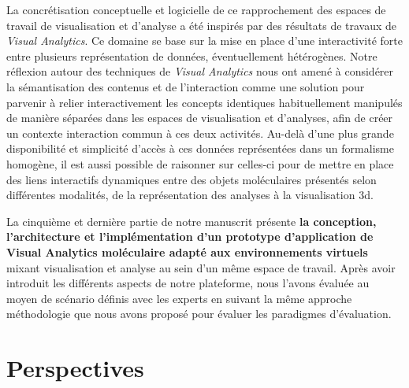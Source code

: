 La concrétisation conceptuelle et logicielle de ce rapprochement des espaces de travail de visualisation et d'analyse a été inspirés par des résultats de travaux de \textit{Visual Analytics}. Ce domaine se base sur la mise en place d'une interactivité forte entre plusieurs représentation de données, éventuellement hétérogènes. Notre réflexion autour des techniques de \textit{Visual Analytics} nous ont amené à considérer la sémantisation des contenus et de l'interaction comme une solution pour parvenir à relier interactivement les concepts identiques habituellement manipulés de manière séparées dans les espaces de visualisation et d'analyses, afin de créer un contexte interaction commun à ces deux activités. Au-delà d'une plus grande disponibilité et simplicité d'accès à ces données représentées dans un formalisme homogène, il est aussi possible de raisonner sur celles-ci pour de mettre en place des liens interactifs dynamiques entre des objets moléculaires présentés selon différentes modalités, de la représentation des analyses à la visualisation 3d. 

La cinquième et dernière partie de notre manuscrit présente \textbf{la conception, l'architecture et l'implémentation d'un prototype d'application de Visual Analytics moléculaire adapté aux environnements virtuels} mixant visualisation et analyse au sein d'un même espace de travail. Après avoir introduit les différents aspects de notre plateforme, nous l'avons évaluée au moyen de scénario définis avec les experts en suivant la même approche méthodologie que nous avons proposé pour évaluer les paradigmes d'évaluation. 


\section*{Perspectives}



